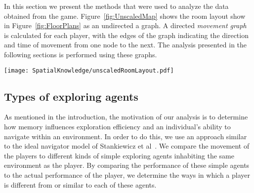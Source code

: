In this section we present the methods that were used to analyze the data obtained from the game. Figure~\ref{fig:UnscaledMap} shows the room layout show in Figure~\ref{fig:FloorPlans} as an undirected a graph. A directed \emph{movement graph} is calculated for each player, with the edges of the graph indicating the direction and time of movement from one node to the next. The analysis presented in the following sections is performed using these graphs.


\begin{sidewaysfigure*}[!htbp]
\centering
\texttt{[image: SpatialKnowledge/unscaledRoomLayout.pdf]}
\caption[Graphical representation of floor plan]{This figure shows a graphical representation of the room layout in Figure~\ref{fig:FloorPlans}}
\label{fig:UnscaledMap}
\end{sidewaysfigure*}



\subsection{Types of exploring agents}
\label{sec:types_of_data}

As mentioned in the introduction, the motivation of our analysis is to determine how memory influences exploration efficiency and an individual's ability to navigate within an environment. In order to do this, we use an approach similar to the ideal navigator model of  Stankiewicz et al~\cite{stankiewicz2006lost}. We compare the movement of the players to different kinds of simple exploring agents inhabiting the same environment as the player. By comparing the performance of these simple agents to the actual performance of the player, we determine the ways in which a player is different from or similar to each of these agents.

